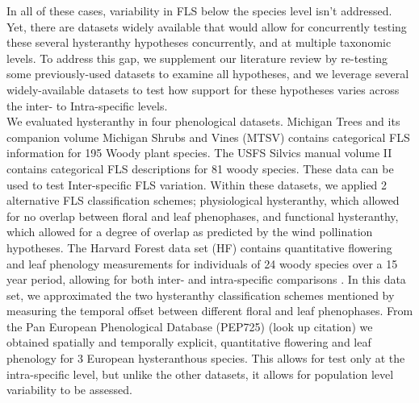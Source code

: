 \documentclass[12pt]{article}\usepackage[]{graphicx}\usepackage[]{color}
\begin{document}
\indent In all of these cases, variability in FLS below the species level isn't addressed. Yet, there are datasets widely available that would allow for concurrently testing these several hysteranthy hypotheses concurrently, and at multiple taxonomic levels. To address this gap, we supplement our literature review by re-testing some previously-used datasets to examine all hypotheses, and we leverage several widely-available datasets to test how support for these hypotheses varies across the inter- to Intra-specific levels.\\ 
\indent We evaluated hysteranthy in four phenological datasets. Michigan Trees and its companion volume Michigan Shrubs and Vines \citep{Barnes2004,Barnes2016} (MTSV) contains categorical FLS information for 195 Woody plant species. The USFS Silvics manual volume II \citep{Burns1990} contains categorical FLS descriptions for 81 woody species. These data can be used to test Inter-specific FLS variation. Within these datasets, we applied 2 alternative FLS classification schemes; physiological hysteranthy, which allowed for no overlap between floral and leaf phenophases, and functional hysteranthy, which allowed for a degree of overlap as predicted by the wind pollination hypotheses. The Harvard Forest data set (HF) contains quantitative flowering and leaf phenology measurements for individuals of 24 woody species over a 15 year period, allowing for both inter- and intra-specific comparisons \citep{OKeefe2015}. In this data set, we approximated the two hysteranthy classification schemes mentioned by measuring the temporal offset between different floral and leaf phenophases. From the Pan European Phenological Database (PEP725) (look up citation) we obtained spatially and temporally explicit, quantitative flowering and leaf phenology for 3 European hysteranthous species. This allows for test only at the intra-specific level, but unlike the other datasets, it allows for population level variability to be assessed.\\
\end{document}
